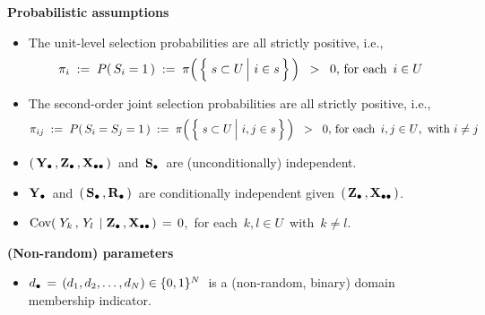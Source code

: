 \vskip 0.2cm
\noindent
\textbf{Probabilistic assumptions}
\begin{itemize}
\item
    The unit-level selection probabilities are all strictly positive, i.e.,
    \begin{equation*}
    \pi_{i}
    \; := \;
        P(\,S_{i} = 1\,)
    \; := \;
        \pi\!\left(\,\left\{\,
            \left.
            s \overset{{\color{white}.}}{\subset} U
            \,\right\vert\,
            i \in s
            \,\right\}
        \,\right)
    \;\; > \;\;
        0,\,
    \textnormal{for each \,$i \in U$\,
    }
    \end{equation*}
\item
    The second-order joint selection probabilities are all strictly positive, i.e.,
    \begin{equation*}
    \pi_{ij}
    \; := \;
        P(\,S_{i} = S_{j} = 1\,)
    \; := \;
        \pi\!\left(\,\left\{\,
            \left.
            s \overset{{\color{white}.}}{\subset} U
            \,\right\vert\,
            i, j \in s
            \,\right\}
        \,\right)
    \;\; > \;\;
        0,\,
    \textnormal{for each \,$i,j \in U$,\, with $i \neq j$}
    \end{equation*}
\item
    $\left(\,\mathbf{Y}_{\bullet}\,,\mathbf{Z}_{\bullet}\,,\mathbf{X}_{\bullet\bullet}\,\right)$\, and \,$\mathbf{S}_{\bullet}$\, are (unconditionally) independent.
\item
    $\mathbf{Y}_{\bullet}$\,
    and
    \,$(\,\mathbf{S}_{\bullet}\,,\mathbf{R}_{\bullet}\,)$\,
    are {\color{red}conditionally independent} given \,$\left(\,\mathbf{Z}_{\bullet}\,,\mathbf{X}_{\bullet\bullet}\,\right)$.
\item
    $\textnormal{Cov}\!\left(\;Y_{k}\,,\,Y_{l}\;\left\vert\;\mathbf{Z}_{\bullet}\,,\mathbf{X}_{\bullet\bullet}\right.\right) \,=\, 0$,\,
    for each \,$k, l \in U$\, with \,$k \neq l$.
\end{itemize}

\vskip 0.2cm
\noindent
\textbf{(Non-random) parameters}
\begin{itemize}
\item
    $d_{\bullet} \,=\, (d_{1},d_{2},\ldots,d_{N}) \in \{0,1\}^{N}$\,
    is a (non-random, binary) domain membership indicator.
\end{itemize}

